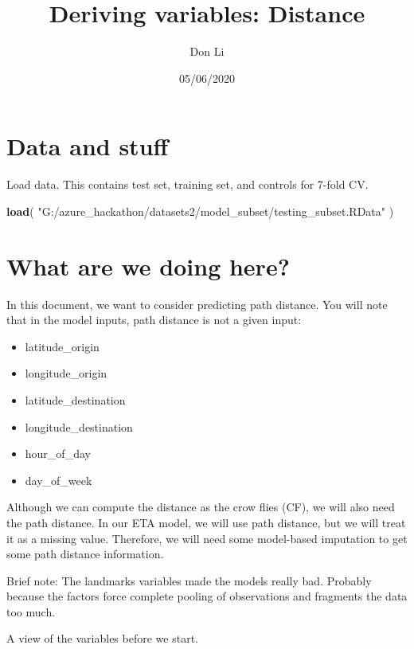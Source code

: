 \documentclass[]{article}
\title{Deriving variables: Distance}
\author{Don Li}
\date{05/06/2020}
\newenvironment{Shaded}{\begin{snugshade}}{\end{snugshade}}
\newcommand{\KeywordTok}[1]{\textcolor[rgb]{0.13,0.29,0.53}{\textbf{#1}}}
\newcommand{\NormalTok}[1]{#1}
\newcommand{\StringTok}[1]{\textcolor[rgb]{0.31,0.60,0.02}{#1}}
\providecommand{\tightlist}{%
  \setlength{\itemsep}{0pt}\setlength{\parskip}{0pt}}
\begin{document}
\maketitle

\hypertarget{data-and-stuff}{%
\section{Data and stuff}\label{data-and-stuff}}

Load data. This contains test set, training set, and controls for 7-fold
CV.

\begin{Shaded}
\begin{Highlighting}[]
\KeywordTok{load}\NormalTok{( }\StringTok{"G:/azure_hackathon/datasets2/model_subset/testing_subset.RData"}\NormalTok{ )}
\end{Highlighting}
\end{Shaded}

\hypertarget{what-are-we-doing-here}{%
\section{What are we doing here?}\label{what-are-we-doing-here}}

In this document, we want to consider predicting path distance. You will
note that in the model inputs, path distance is not a given input:

\begin{itemize}
\tightlist
\item
  latitude\_origin
\item
  longitude\_origin
\item
  latitude\_destination
\item
  longitude\_destination
\item
  hour\_of\_day
\item
  day\_of\_week
\end{itemize}

Although we can compute the distance as the crow flies (CF), we will
also need the path distance. In our ETA model, we will use path
distance, but we will treat it as a missing value. Therefore, we will
need some model-based imputation to get some path distance information.

Brief note: The landmarks variables made the models really bad. Probably
because the factors force complete pooling of observations and fragments
the data too much.

A view of the variables before we start.
\end{document}
